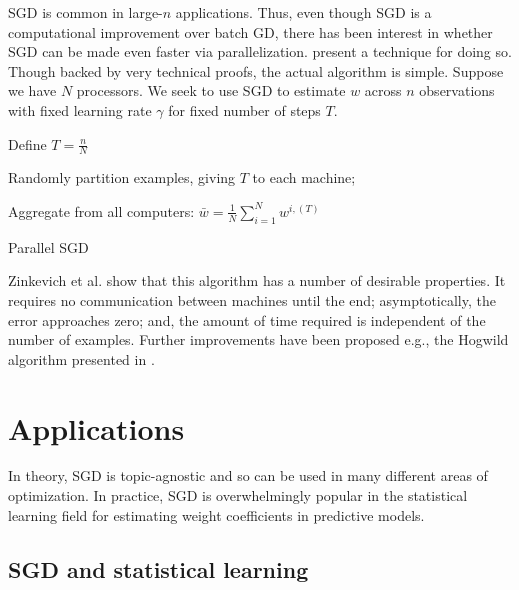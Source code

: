 \documentclass{report}
\begin{document}
SGD is common in large-$n$ applications. Thus,
even though SGD is a computational improvement over batch GD, there has been
interest in whether SGD can be made even faster via parallelization.
\cite{zinkevich2010parallelized} present a technique for doing so. Though backed
by very technical proofs, the actual algorithm is simple. Suppose we have $N$ processors. We seek to
use SGD to estimate $w$ across $n$ observations with fixed learning rate
$\gamma$ for fixed number of steps $T$.

\medskip

\begin{algorithm}[H]
	Define $T = \frac{n}{N}$\;

	Randomly partition examples, giving $T$ to each machine;\

	Aggregate from all computers: $\bar{w} = \frac{1}{N} \sum_{i=1}^{N}
	w^{i, (T)}$ \;


	\caption{Parallel SGD}
\end{algorithm}

\medskip

Zinkevich et al. show that this algorithm has a number of desirable properties.
It requires no communication between machines until the end; asymptotically, the
error approaches zero; and, the amount of time required is independent of the number of
examples. Further improvements have been proposed e.g., the Hogwild algorithm
presented in \cite{recht2011hogwild}.

\chapter{Applications}

In theory, SGD is topic-agnostic and so can be used in many different areas of optimization. In
practice, SGD is overwhelmingly popular in the statistical learning
field for estimating weight coefficients in predictive models. 

\section{SGD and statistical learning}
\end{document}
